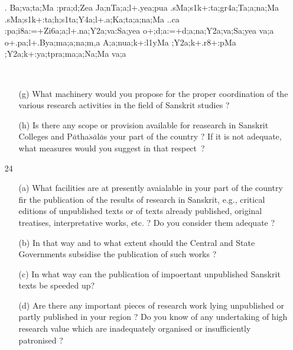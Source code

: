 \begin{itemize}
\item[{\sktf 26}.] {\sktf Ba;va;ta;Ma :pra;d;Zea Ja;nTa;a;l+.yea;pua
.sMa;s1k+:ta;gr4a;Ta;a;na;Ma .sMa;s1k+:ta;h;s1ta;Y4a;l+.a;Ka;ta;a;na;Ma ..ca
:pa;i8a:=+Zi6a;a;l+.na;Y2a;va:Sa;yea o+;d;a:=+d;a;na;Y2a;va;Sa;yea va;a o+.pa;l+.Bya;ma;a;na;m,a
A;a;nua;k+:l1yMa ;Y2a;k+.r8+:pMa
;Y2a;k+:ya;tpra;ma;a;Na;Ma va;a}
\end{itemize}

{\rm 
\begin{itemize} 
\item[~]\begin{itemize}
\item[(g)] What machinery would you propose for the proper coordination of the various research activities in the field of Sanskrit studies ?
              
              \item[(h)] Is there any scope or provision available for reasearch in Sanskrit Colleges and P$\bar{a}$tha$\acute{s}\bar{a}$l$\bar{a}$s your part of the country ? If it is not adequate, what measures would you suggest in that respect~?
              \end{itemize}

\item[24] \begin{itemize}
          
          \item[(a)] What facilities are at presently avaialable in your part of the country fir the publication of the results of research in Sanskrit, e.g., critical editions of unpublished texts or of texts already published, original treatises, interpretative works, etc. ? Do you consider them adequate ?
          
          \item[(b)] In that way and to what extent should the Central and State Governments subsidise the publication of such works ?
          
          \item[(c)] In what way can the publication of impoertant unpublished Sanskrit texts be speeded up?
          
          \item[(d)] Are there any important pieces of research work lying unpublished or partly published in your region ? Do you know of any undertaking of high research value which are inadequately organised or insufficiently patronised ?
           \end{itemize} 


\end{itemize}}
